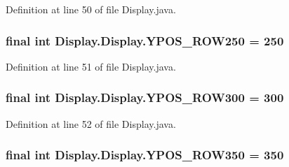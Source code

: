 Definition at line 50 of file Display.\+java.

\hypertarget{class_display_1_1_display_a76fe305a0d851cc121da69952ee13b00}{}
\subsubsection[{Y\+P\+O\+S\+\_\+\+R\+O\+W250}]{\setlength{\rightskip}{0pt plus 5cm}final int Display.\+Display.\+Y\+P\+O\+S\+\_\+\+R\+O\+W250 = 250\hspace{0.3cm}{\ttfamily [static]}}\label{class_display_1_1_display_a76fe305a0d851cc121da69952ee13b00}


Definition at line 51 of file Display.\+java.

\hypertarget{class_display_1_1_display_aaf16f1b813645dc5969d6547d7947b3a}{}
\subsubsection[{Y\+P\+O\+S\+\_\+\+R\+O\+W300}]{\setlength{\rightskip}{0pt plus 5cm}final int Display.\+Display.\+Y\+P\+O\+S\+\_\+\+R\+O\+W300 = 300\hspace{0.3cm}{\ttfamily [static]}}\label{class_display_1_1_display_aaf16f1b813645dc5969d6547d7947b3a}


Definition at line 52 of file Display.\+java.

\hypertarget{class_display_1_1_display_ad479e849d0564e40118e7d76652d9ffa}{}
\subsubsection[{Y\+P\+O\+S\+\_\+\+R\+O\+W350}]{\setlength{\rightskip}{0pt plus 5cm}final int Display.\+Display.\+Y\+P\+O\+S\+\_\+\+R\+O\+W350 = 350\hspace{0.3cm}{\ttfamily [static]}}\label{class_display_1_1_display_ad479e849d0564e40118e7d76652d9ffa}


